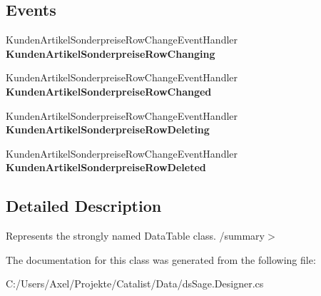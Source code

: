 \subsection*{Events}
\begin{DoxyCompactItemize}
\item 
Kunden\+Artikel\+Sonderpreise\+Row\+Change\+Event\+Handler {\bfseries Kunden\+Artikel\+Sonderpreise\+Row\+Changing}\hypertarget{class_products_1_1_data_1_1ds_sage_1_1_kunden_artikel_sonderpreise_data_table_ae4f7ea74115ecd0595477038e26ef678}{}\label{class_products_1_1_data_1_1ds_sage_1_1_kunden_artikel_sonderpreise_data_table_ae4f7ea74115ecd0595477038e26ef678}

\item 
Kunden\+Artikel\+Sonderpreise\+Row\+Change\+Event\+Handler {\bfseries Kunden\+Artikel\+Sonderpreise\+Row\+Changed}\hypertarget{class_products_1_1_data_1_1ds_sage_1_1_kunden_artikel_sonderpreise_data_table_a88cd9cc1df98f804c47240247fab5eb6}{}\label{class_products_1_1_data_1_1ds_sage_1_1_kunden_artikel_sonderpreise_data_table_a88cd9cc1df98f804c47240247fab5eb6}

\item 
Kunden\+Artikel\+Sonderpreise\+Row\+Change\+Event\+Handler {\bfseries Kunden\+Artikel\+Sonderpreise\+Row\+Deleting}\hypertarget{class_products_1_1_data_1_1ds_sage_1_1_kunden_artikel_sonderpreise_data_table_a2d547cf8b03df9bb37ad3ced3e268228}{}\label{class_products_1_1_data_1_1ds_sage_1_1_kunden_artikel_sonderpreise_data_table_a2d547cf8b03df9bb37ad3ced3e268228}

\item 
Kunden\+Artikel\+Sonderpreise\+Row\+Change\+Event\+Handler {\bfseries Kunden\+Artikel\+Sonderpreise\+Row\+Deleted}\hypertarget{class_products_1_1_data_1_1ds_sage_1_1_kunden_artikel_sonderpreise_data_table_aa04ff3142322bba5156830f2075ed5d9}{}\label{class_products_1_1_data_1_1ds_sage_1_1_kunden_artikel_sonderpreise_data_table_aa04ff3142322bba5156830f2075ed5d9}

\end{DoxyCompactItemize}


\subsection{Detailed Description}
Represents the strongly named Data\+Table class. /summary$>$ 

The documentation for this class was generated from the following file\+:\begin{DoxyCompactItemize}
\item 
C\+:/\+Users/\+Axel/\+Projekte/\+Catalist/\+Data/ds\+Sage.\+Designer.\+cs\end{DoxyCompactItemize}
